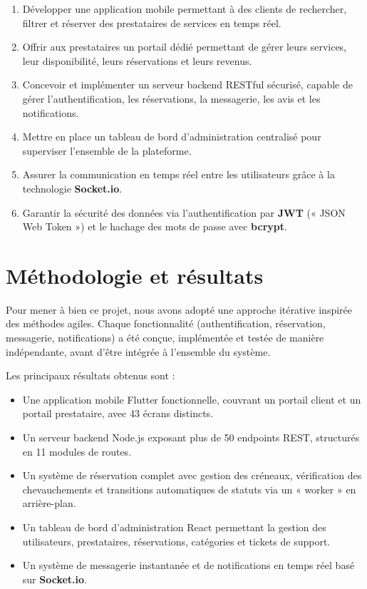 \begin{enumerate}
    \item Développer une application mobile permettant à des clients de rechercher, filtrer et réserver des prestataires de services en temps réel.
    \item Offrir aux prestataires un portail dédié permettant de gérer leurs services, leur disponibilité, leurs réservations et leurs revenus.
    \item Concevoir et implémenter un serveur backend RESTful sécurisé, capable de gérer l'authentification, les réservations, la messagerie, les avis et les notifications.
    \item Mettre en place un tableau de bord d'administration centralisé pour superviser l'ensemble de la plateforme.
    \item Assurer la communication en temps réel entre les utilisateurs grâce à la technologie \textbf{Socket.io}.
    \item Garantir la sécurité des données via l'authentification par \textbf{JWT} (« JSON Web Token ») et le hachage des mots de passe avec \textbf{bcrypt}.
\end{enumerate}

\section{Méthodologie et résultats}

Pour mener à bien ce projet, nous avons adopté une approche itérative inspirée des méthodes agiles. Chaque fonctionnalité (authentification, réservation, messagerie, notifications) a été conçue, implémentée et testée de manière indépendante, avant d'être intégrée à l'ensemble du système.

Les principaux résultats obtenus sont :

\begin{itemize}
    \item Une application mobile Flutter fonctionnelle, couvrant un portail client et un portail prestataire, avec 43 écrans distincts.
    \item Un serveur backend Node.js exposant plus de 50 endpoints REST, structurés en 11 modules de routes.
    \item Un système de réservation complet avec gestion des créneaux, vérification des chevauchements et transitions automatiques de statuts via un « worker » en arrière-plan.
    \item Un tableau de bord d'administration React permettant la gestion des utilisateurs, prestataires, réservations, catégories et tickets de support.
    \item Un système de messagerie instantanée et de notifications en temps réel basé sur \textbf{Socket.io}.
\end{itemize}

